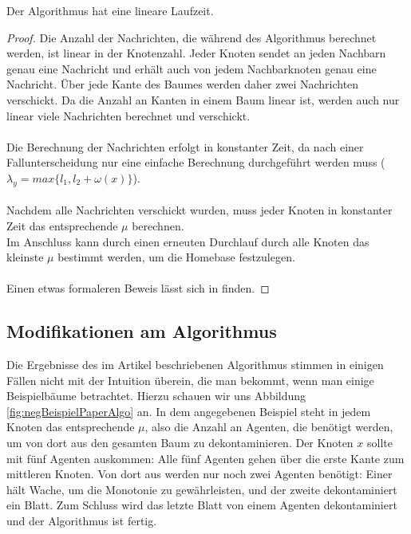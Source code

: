 	\begin{theorem}\label{thm_laufzeit}
		Der Algorithmus hat eine lineare Laufzeit.
	\end{theorem}
	\begin{proof}
		Die Anzahl der Nachrichten, die während des Algorithmus berechnet werden, ist linear in der Knotenzahl. Jeder Knoten sendet an jeden Nachbarn genau eine Nachricht und erhält auch von jedem Nachbarknoten genau eine Nachricht. Über jede Kante des Baumes werden daher zwei Nachrichten verschickt. Da die Anzahl an Kanten in einem Baum linear ist, werden auch nur linear viele Nachrichten berechnet und verschickt.\\\\
		Die Berechnung der Nachrichten erfolgt in konstanter Zeit, da nach einer Fallunterscheidung nur eine einfache Berechnung durchgeführt werden muss ($\lambda_{y} = max\{l_{1},  l_{2} + \omega(x)\}$).\\\\
		Nachdem alle Nachrichten verschickt wurden, muss jeder Knoten in konstanter Zeit das entsprechende $\mu$ berechnen.\\
		Im Anschluss kann durch einen erneuten Durchlauf durch alle Knoten das kleinste $\mu$ bestimmt werden, um die Homebase festzulegen.
		\\
		\\
		Einen etwas formaleren Beweis lässt sich in \cite{cima_paper} finden.
	\end{proof}

\newpage

\subsection{Modifikationen am Algorithmus}\label{modifizierterAlgoChapter}



Die Ergebnisse des im Artikel beschriebenen Algorithmus stimmen in einigen Fällen nicht mit der Intuition überein, die man bekommt, wenn man einige Beispielbäume betrachtet. Hierzu schauen wir uns Abbildung \ref{fig:negBeispielPaperAlgo} an. In dem  angegebenen Beispiel steht in jedem Knoten das entsprechende $\mu$, also die Anzahl an Agenten, die benötigt werden, um von dort aus den gesamten Baum zu dekontaminieren. Der Knoten $x$ sollte mit fünf Agenten auskommen: Alle fünf Agenten gehen über die erste Kante zum mittleren Knoten. Von dort aus werden nur noch zwei Agenten benötigt: Einer hält Wache, um die Monotonie zu gewährleisten, und der zweite dekontaminiert ein Blatt. Zum Schluss wird das letzte Blatt von einem Agenten dekontaminiert und der Algorithmus ist fertig.

